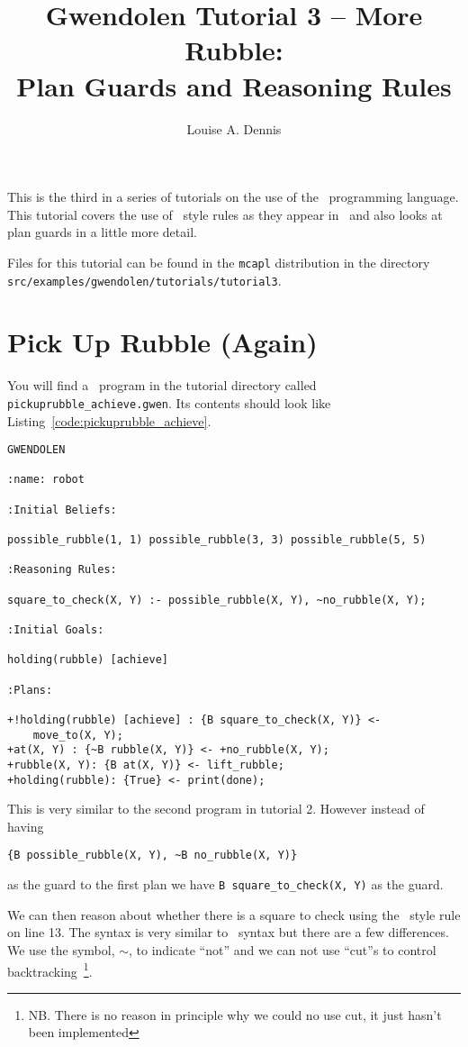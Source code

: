 \documentclass[a4]{article}
\author{Louise A. Dennis}
\title{Gwendolen Tutorial 3 -- More Rubble: \\
Plan Guards and Reasoning Rules}
\begin{document}
\maketitle
This is the third in a series of tutorials on the use of the \gwendolen\ programming language.  This tutorial covers the use of \prolog\ style rules as they appear in \gwendolen\ and also looks at plan guards in a little more detail.

Files for this tutorial can be found in the \texttt{mcapl} distribution in the directory \texttt{src/examples/gwendolen/tutorials/tutorial3}.

\section{Pick Up Rubble (Again)}

You will find a \gwendolen\ program in the tutorial directory called \texttt{pickuprubble\_achieve.gwen}.  Its contents should look like Listing~\ref{code:pickuprubble_achieve}.
\begin{lstlisting}[float,caption=Pick Up Rubble (Reasoning Rules),basicstyle=\sffamily,style=easslisting,language=Gwendolen,label=code:pickuprubble_achieve]
GWENDOLEN

:name: robot

:Initial Beliefs:

possible_rubble(1, 1) possible_rubble(3, 3) possible_rubble(5, 5)

:Reasoning Rules:

square_to_check(X, Y) :- possible_rubble(X, Y), ~no_rubble(X, Y);

:Initial Goals:

holding(rubble) [achieve]

:Plans:

+!holding(rubble) [achieve] : {B square_to_check(X, Y)} <- 
    move_to(X, Y);
+at(X, Y) : {~B rubble(X, Y)} <- +no_rubble(X, Y);
+rubble(X, Y): {B at(X, Y)} <- lift_rubble;
+holding(rubble): {True} <- print(done);
\end{lstlisting}

This is very similar to the second program in tutorial 2.  However instead of having 
\begin{verbatim}
{B possible_rubble(X, Y), ~B no_rubble(X, Y)}
\end{verbatim}as the guard to the first plan we have \lstinline{B square_to_check(X, Y)} as the guard.

We can then reason about whether there is a square to check using the \prolog\ style rule on line 13.  The syntax is very similar to \prolog\ syntax but there are a few differences.  We use the symbol, $\sim$, to indicate ``not'' and we can not use ``cut''s to control backtracking~\footnote{NB.  There is no reason in principle why we could no use cut, it just hasn't been implemented}.
\end{document}
